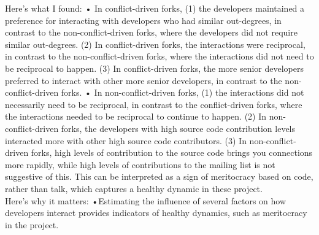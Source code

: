 \documentclass[12pt]{report}
\begin{document}
Here’s what I found:
• In conflict-driven forks, (1) the developers maintained a preference for interacting with developers who had similar out-degrees, in contrast to the non-conflict-driven forks, where the developers did not require similar out-degrees. (2) In conflict-driven forks, the interactions were reciprocal, in contrast to the non-conflict-driven forks, where the interactions did not need to be reciprocal to happen. (3) In conflict-driven forks, the more senior developers preferred to interact with other more senior developers, in contrast to the non-conflict-driven forks.
• In non-conflict-driven forks, (1) the interactions did not necessarily need to be reciprocal, in contrast to the conflict-driven forks, where the interactions needed to be reciprocal to continue to happen. (2) In non-conflict-driven forks, the developers with high source code contribution levels interacted more with other high source code contributors. (3) In non-conflict-driven forks, high levels of contribution to the source code brings you connections more rapidly,
while high levels of contributions to the mailing list is not suggestive of this. This can be interpreted as a sign of meritocracy based on code, rather than talk, which captures a healthy dynamic in these project.\\

Here’s why it matters:
•Estimating the influence of several factors on how developers interact provides indicators of healthy dynamics, such as meritocracy in the project.\\
\end{document}
